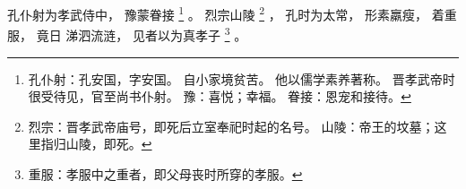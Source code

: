 
\switchcolumn*[\section{}]

孔仆射为孝武侍中，
豫蒙眷接%
\footnote{%
    孔仆射：孔安国，字安国。
            自小家境贫苦。
            他以儒学素养著称。
            晋孝武帝时很受待见，官至尚书仆射。
    豫：喜悦；幸福。
    眷接：恩宠和接待。
}%
。
烈宗山陵%
\footnote{%
    烈宗：晋孝武帝庙号，即死后立室奉祀时起的名号。
    山陵：帝王的坟墓；这里指归山陵，即死。
}%
，
孔时为太常，
形素羸瘦，
着重服，
竟日
涕泗流涟，
见者以为真孝子%
\footnote{%
    重服：孝服中之重者，即父母丧时所穿的孝服。
}%
。

\switchcolumn



